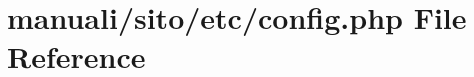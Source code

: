 \hypertarget{config_8php}{}\section{manuali/sito/etc/config.php File Reference}
\label{config_8php}
